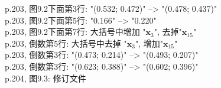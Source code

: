 \documentclass[UTF8]{article}
\begin{document}
p.203, 图9.2下面第3行: "(0.532; 0.472)" --> "(0.478; 0.437)" \\
p.203, 图9.2下面第5行: "0.166" --> "0.220" \\
p.203, 图9.2下面第7行: 大括号中增加 "$\bm{x}_3$", 去掉"$\bm{x}_{15}$" \\
p.203, 倒数第5行: 大括号中去掉 "$\bm{x}_3$", 增加"$\bm{x}_{15}$" \\
p.203, 倒数第3行: "(0.473; 0.214)" --> "(0.493; 0.207)" \\
p.203, 倒数第3行: "(0.623; 0.388)" --> "(0.602; 0.396)" \\
p.204, 图9.3: 修订文件     \\
\begin{figure}
	\centering
\end{figure}
\begin{figure}
	\centering
\end{figure}\\
\end{document}
